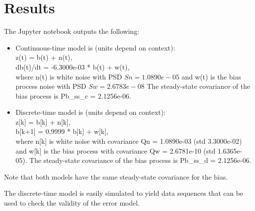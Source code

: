\documentclass[letter,twocolumn]{article}
\begin{document}
\section{Results}
The Jupyter notebook outputs the following:
\begin{itemize}
	\item 
	Continuous-time model is (units depend on context): \\
	z(t) = b(t) + n(t), \\
	db(t)/dt = -6.3000e-03 * b(t) + w(t), \\
	where n(t) is white noise with PSD $Sn = 1.0890e-05$
	and w(t) is the bias process noise with PSD $Sw = 2.6783e-08$
	The steady-state covariance of the bias process is Pb\_ss\_c = 2.1256e-06.
	
	\item Discrete-time model is (units depend on context): \\
	z[k] = b[k] + n[k], \\
	b[k+1] = 0.9999 * b[k] + w[k], \\
	where n[k] is white noise with covariance Qn = 1.0890e-03 (std 3.3000e-02)
	and w[k] is the bias process with covariance Qw = 2.6781e-10 (std 1.6365e-05).
	The steady-state covariance of the bias process is Pb\_ss\_d = 2.1256e-06.
\end{itemize}
Note that both models have the same steady-state covariance for the bias.

The discrete-time model is easily simulated to yield data sequences that can be used to check the validity of the error model.
\end{document}
